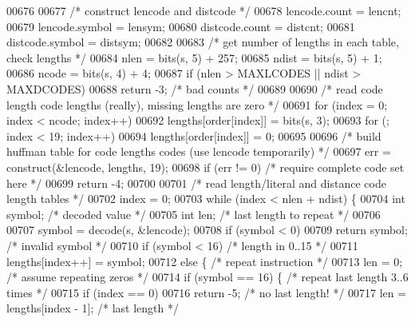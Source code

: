 \begin{DoxyCode}
00676 
00677     \textcolor{comment}{/* construct lencode and distcode */}
00678     lencode.count = lencnt;
00679     lencode.symbol = lensym;
00680     distcode.count = distcnt;
00681     distcode.symbol = distsym;
00682 
00683     \textcolor{comment}{/* get number of lengths in each table, check lengths */}
00684     nlen = bits(s, 5) + 257;
00685     ndist = bits(s, 5) + 1;
00686     ncode = bits(s, 4) + 4;
00687     \textcolor{keywordflow}{if} (nlen > MAXLCODES || ndist > MAXDCODES)
00688         \textcolor{keywordflow}{return} -3;                      \textcolor{comment}{/* bad counts */}
00689 
00690     \textcolor{comment}{/* read code length code lengths (really), missing lengths are zero */}
00691     \textcolor{keywordflow}{for} (index = 0; index < ncode; index++)
00692         lengths[order[index]] = bits(s, 3);
00693     \textcolor{keywordflow}{for} (; index < 19; index++)
00694         lengths[order[index]] = 0;
00695 
00696     \textcolor{comment}{/* build huffman table for code lengths codes (use lencode temporarily) */}
00697     err = construct(&lencode, lengths, 19);
00698     \textcolor{keywordflow}{if} (err != 0)               \textcolor{comment}{/* require complete code set here */}
00699         \textcolor{keywordflow}{return} -4;
00700 
00701     \textcolor{comment}{/* read length/literal and distance code length tables */}
00702     index = 0;
00703     \textcolor{keywordflow}{while} (index < nlen + ndist) \{
00704         \textcolor{keywordtype}{int} symbol;             \textcolor{comment}{/* decoded value */}
00705         \textcolor{keywordtype}{int} len;                \textcolor{comment}{/* last length to repeat */}
00706 
00707         symbol = decode(s, &lencode);
00708         \textcolor{keywordflow}{if} (symbol < 0)
00709             \textcolor{keywordflow}{return} symbol;          \textcolor{comment}{/* invalid symbol */}
00710         \textcolor{keywordflow}{if} (symbol < 16)                \textcolor{comment}{/* length in 0..15 */}
00711             lengths[index++] = symbol;
00712         \textcolor{keywordflow}{else} \{                          \textcolor{comment}{/* repeat instruction */}
00713             len = 0;                    \textcolor{comment}{/* assume repeating zeros */}
00714             \textcolor{keywordflow}{if} (symbol == 16) \{         \textcolor{comment}{/* repeat last length 3..6 times */}
00715                 \textcolor{keywordflow}{if} (index == 0)
00716                     \textcolor{keywordflow}{return} -5;          \textcolor{comment}{/* no last length! */}
00717                 len = lengths[index - 1];       \textcolor{comment}{/* last length */}

\end{DoxyCode}
